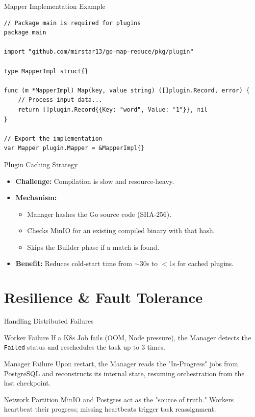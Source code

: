 \documentclass[10pt,aspectratio=169]{beamer}
\begin{document}
\begin{frame}[fragile]{Mapper Implementation Example}
\begin{lstlisting}
// Package main is required for plugins
package main

import "github.com/mirstar13/go-map-reduce/pkg/plugin"

type MapperImpl struct{}

func (m *MapperImpl) Map(key, value string) ([]plugin.Record, error) {
    // Process input data...
    return []plugin.Record{{Key: "word", Value: "1"}}, nil
}

// Export the implementation
var Mapper plugin.Mapper = &MapperImpl{}
\end{lstlisting}
\end{frame}

\begin{frame}{Plugin Caching Strategy}
    \begin{itemize}
        \item \textbf{Challenge:} Compilation is slow and resource-heavy.
        \item \textbf{Mechanism:} 
            \begin{itemize}
                \item Manager hashes the Go source code (SHA-256).
                \item Checks MinIO for an existing compiled binary with that hash.
                \item Skips the Builder phase if a match is found.
            \end{itemize}
        \item \textbf{Benefit:} Reduces cold-start time from $\sim$30s to $<$1s for cached plugins.
    \end{itemize}
\end{frame}

\section{Resilience \& Fault Tolerance}

\begin{frame}{Handling Distributed Failures}
    \begin{block}{Worker Failure}
        If a K8s Job fails (OOM, Node pressure), the Manager detects the \texttt{Failed} status and reschedules the task up to 3 times.
    \end{block}
    \begin{block}{Manager Failure}
        Upon restart, the Manager reads the "In-Progress" jobs from PostgreSQL and reconstructs its internal state, resuming orchestration from the last checkpoint.
    \end{block}
    \begin{block}{Network Partition}
        MinIO and Postgres act as the "source of truth." Workers heartbeat their progress; missing heartbeats trigger task reassignment.
    \end{block}
\end{frame}
\end{document}

